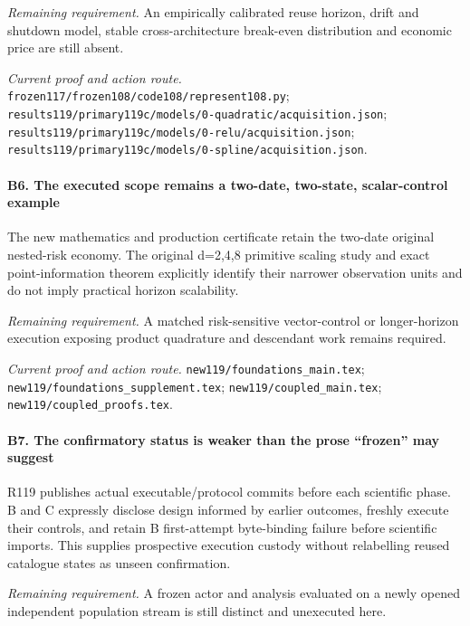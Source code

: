 \par\emph{Remaining requirement.} An empirically calibrated reuse horizon, drift and shutdown model, stable cross-architecture break-even distribution and economic price are still absent.

\par\emph{Current proof and action route.} \nolinkurl{frozen117/frozen108/code108/represent108.py}; \nolinkurl{results119/primary119c/models/0-quadratic/acquisition.json}; \nolinkurl{results119/primary119c/models/0-relu/acquisition.json}; \nolinkurl{results119/primary119c/models/0-spline/acquisition.json}.

\paragraph{B6. The executed scope remains a two-date, two-state, scalar-control example}

The new mathematics and production certificate retain the two-date original nested-risk economy. The original d=2,4,8 primitive scaling study and exact point-information theorem explicitly identify their narrower observation units and do not imply practical horizon scalability.

\par\emph{Remaining requirement.} A matched risk-sensitive vector-control or longer-horizon execution exposing product quadrature and descendant work remains required.

\par\emph{Current proof and action route.} \nolinkurl{new119/foundations_main.tex}; \nolinkurl{new119/foundations_supplement.tex}; \nolinkurl{new119/coupled_main.tex}; \nolinkurl{new119/coupled_proofs.tex}.

\paragraph{B7. The confirmatory status is weaker than the prose “frozen” may suggest}

R119 publishes actual executable/\allowbreak{}protocol commits before each scientific phase. B and C expressly disclose design informed by earlier outcomes, freshly execute their controls, and retain B first-attempt byte-binding failure before scientific imports. This supplies prospective execution custody without relabelling reused catalogue states as unseen confirmation.

\par\emph{Remaining requirement.} A frozen actor and analysis evaluated on a newly opened independent population stream is still distinct and unexecuted here.


